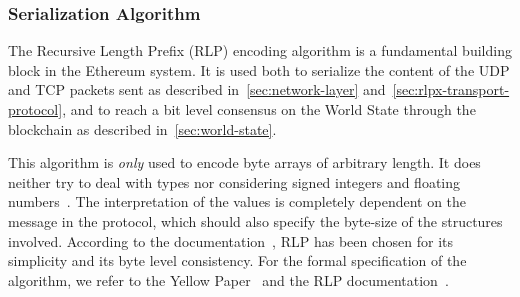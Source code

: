 \subsubsection{Serialization Algorithm}
\label{sec:marshaling}

The Recursive Length Prefix (RLP) encoding algorithm is a fundamental building
block in the Ethereum system. It is used both to serialize the content of the
UDP and TCP packets sent as described in~\autoref{sec:network-layer}
and~\autoref{sec:rlpx-transport-protocol}, and to reach a bit level consensus on
the World State through the blockchain as described
in~\autoref{sec:world-state}.

This algorithm is \emph{only} used to encode byte arrays of arbitrary length. It
does neither try to deal with types nor considering signed integers and floating
numbers~\cite{wood2018ethereum}. The interpretation of the values is completely
dependent on the message in the protocol, which should also specify the
byte-size of the structures involved. According to the
documentation~\cite{bib:design-rationale}, RLP has been chosen for its
simplicity and its byte level consistency. For the formal specification of the
algorithm, we refer to the Yellow Paper~\cite[Appendix B]{wood2018ethereum} and
the RLP documentation~\cite{bib:ethereumrlpspec}.
